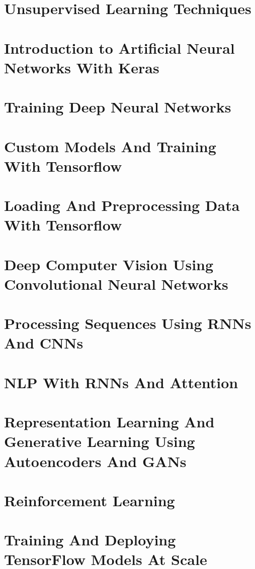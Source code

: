 \documentclass{article}
\begin{document}
    \section{Unsupervised Learning Techniques}
    \section{Introduction to Artificial Neural Networks With Keras}
    \section{Training Deep Neural Networks}
    \section{Custom Models And Training With Tensorflow}
    \section{Loading And Preprocessing Data With Tensorflow}
    \section{Deep Computer Vision Using Convolutional Neural Networks}
    \section{Processing Sequences Using RNNs And CNNs}
    \section{NLP With RNNs And Attention}
    \section{Representation Learning And Generative Learning Using Autoencoders And GANs}
    \section{Reinforcement Learning}
    \section{Training And Deploying TensorFlow Models At Scale}
\end{document}
